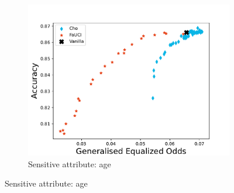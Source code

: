 \begin{figure}
\begin{subfigure}[]{\onethirdsize}
        \centering
        \includegraphics[width=\columnwidth]{figures/fauci/accuracy/equalized_odds_age}
        \caption{Sensitive attribute: age}
        \label{fig:eo-age}
    \end{subfigure}
    \label{fig:eo}
\end{figure}